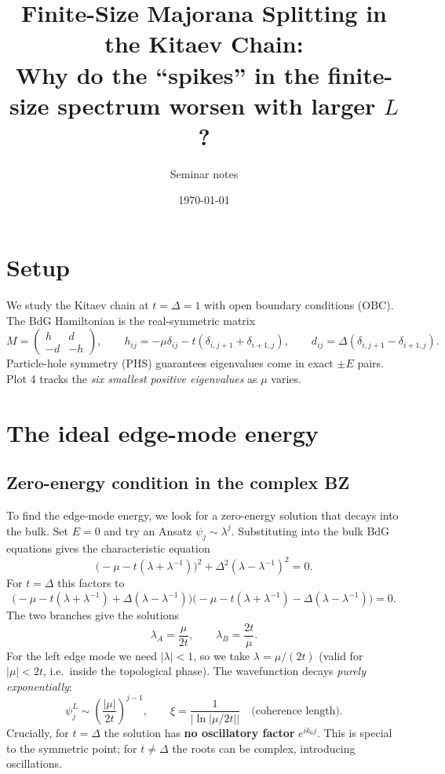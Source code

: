\documentclass[11pt]{article}
\title{Finite-Size Majorana Splitting in the Kitaev Chain:\\
Why do the ``spikes'' in the finite-size spectrum worsen with larger $L$?}
\author{Seminar notes}
\date{\today}
\begin{document}
\maketitle

\section{Setup}

We study the Kitaev chain at $t = \Delta = 1$ with open boundary conditions (OBC).
The BdG Hamiltonian is the real-symmetric matrix
\begin{equation}
  M = \begin{pmatrix} h & d \\ -d & -h \end{pmatrix}, \qquad
  h_{ij} = -\mu\delta_{ij} - t(\delta_{i,j+1}+\delta_{i+1,j}), \qquad
  d_{ij} = \Delta(\delta_{i,j+1}-\delta_{i+1,j}).
\end{equation}
Particle-hole symmetry (PHS) guarantees eigenvalues come in exact $\pm E$ pairs.
Plot 4 tracks the \emph{six smallest positive eigenvalues} as $\mu$ varies.

\section{The ideal edge-mode energy}

\subsection{Zero-energy condition in the complex BZ}

To find the edge-mode energy, we look for a zero-energy solution that decays
into the bulk. Set $E = 0$ and try an Ansatz $\psi_j \sim \lambda^j$.
Substituting into the bulk BdG equations gives the characteristic equation
\begin{equation}
  \bigl(-\mu - t(\lambda + \lambda^{-1})\bigr)^2 + \Delta^2(\lambda - \lambda^{-1})^2 = 0.
\end{equation}
For $t = \Delta$ this factors to
\begin{equation}
  \bigl(-\mu - t(\lambda + \lambda^{-1}) + \Delta(\lambda - \lambda^{-1})\bigr)
  \bigl(-\mu - t(\lambda + \lambda^{-1}) - \Delta(\lambda - \lambda^{-1})\bigr) = 0.
\end{equation}
The two branches give the solutions
\begin{equation}
  \lambda_A = \frac{\mu}{2t}, \qquad \lambda_B = \frac{2t}{\mu}.
\end{equation}
For the left edge mode we need $|\lambda| < 1$, so we take $\lambda = \mu/(2t)$
(valid for $|\mu| < 2t$, i.e.\ inside the topological phase).
The wavefunction decays \emph{purely exponentially}:
\begin{equation}
  \psi_j^L \sim \left(\frac{|\mu|}{2t}\right)^{j-1}, \qquad
  \xi = \frac{1}{|\ln|\mu/2t||} \quad \text{(coherence length)}.
\end{equation}
Crucially, for $t = \Delta$ the solution has \textbf{no oscillatory factor}
$e^{ik_0 j}$. This is special to the symmetric point; for $t \neq \Delta$ the
roots can be complex, introducing oscillations.
\end{document}
